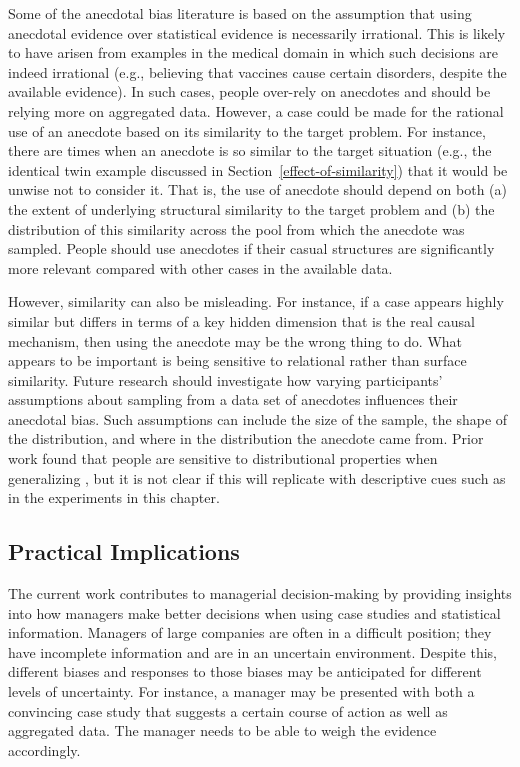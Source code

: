 \documentclass[a4paper, nobind]{templates/ociamthesis}
\theoremstyle{definition}
\theoremstyle{definition}
\theoremstyle{definition}
\theoremstyle{definition}
\theoremstyle{remark}
\begin{document}
Some of the anecdotal bias literature is based on the assumption that using
anecdotal evidence over statistical evidence is necessarily irrational. This is
likely to have arisen from examples in the medical domain in which such
decisions are indeed irrational (e.g., believing that vaccines cause certain
disorders, despite the available evidence). In such cases, people over-rely on
anecdotes and should be relying more on aggregated data. However, a case could
be made for the rational use of an anecdote based on its similarity to the
target problem. For instance, there are times when an anecdote is so similar to
the target situation (e.g., the identical twin example discussed in
Section~\ref{effect-of-similarity}) that it would be unwise not to consider it.
That is, the use of anecdote should depend on both (a) the extent of underlying
structural similarity to the target problem and (b) the distribution of this
similarity across the pool from which the anecdote was sampled. People should
use anecdotes if their casual structures are significantly more relevant
compared with other cases in the available data.

However, similarity can also be misleading. For instance, if a case appears
highly similar but differs in terms of a key hidden dimension that is the real
causal mechanism, then using the anecdote may be the wrong thing to do. What
appears to be important is being sensitive to relational rather than surface
similarity. Future research should investigate how varying participants'
assumptions about sampling from a data set of anecdotes influences their
anecdotal bias. Such assumptions can include the size of the sample, the shape
of the distribution, and where in the distribution the anecdote came from. Prior
work found that people are sensitive to distributional properties when
generalizing \autocite{carvalho2021}, but it is not clear if this will replicate with
descriptive cues such as in the experiments in this chapter.

\subsection{Practical Implications}

The current work contributes to managerial decision-making by providing insights
into how managers make better decisions when using case studies and statistical
information. Managers of large companies are often in a difficult position; they
have incomplete information and are in an uncertain environment. Despite this,
different biases and responses to those biases may be anticipated for different
levels of uncertainty. For instance, a manager may be presented with both a
convincing case study that suggests a certain course of action as well as
aggregated data. The manager needs to be able to weigh the evidence accordingly.
\end{document}
